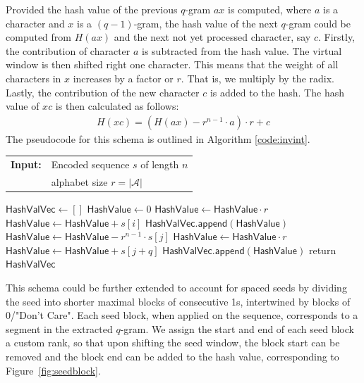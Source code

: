 \documentclass[twoside,a4paper,bsc]{master}
\newcommand{\Qgram}[1]{\(#1\)-gram}
\newcommand{\Append}[0]{\mathsf{append}}
\newcommand{\HashValue}[0]{\mathsf{HashValue}}
\newcommand{\HashValVec}[0]{\mathsf{HashValVec}}
\begin{document}
Provided the hash value of the previous \Qgram{q} \(ax\) is computed, where 
\(a\) is a character and \(x\) is a \Qgram{(q-1)}, the hash value
of the next \Qgram{q} could be computed from \(H(ax)\) and the next not yet
processed character, say \(c\). Firstly, the contribution of character \(a\) is 
subtracted from the hash value. The virtual window is then
shifted right one character. This means that the weight of all characters
in \(x\) increases by a factor or \(r\). That is, we multiply by the radix.
Lastly, the contribution of the new character \(c\) is added to the hash.
The hash value of \(xc\) is then calculated as follows:
\begin{align}
H(xc) = (H(ax)-r^{n-1}\cdot a)\cdot r+c\label{IncrementallyComputeH}
\end{align}
The pseudocode for this schema is outlined in Algorithm \ref{code:invint}.
\begin{algorithm}[t]
\caption{Invertible Integer Encoding for \Qgram{q}s}
\label{code:invint}
\begin{tabular}{@{}l@{~}l}
\textbf{Input:}&Encoded sequence $s$ of length $n$\\
&alphabet size \(r=|\mathcal{A}|\)\\
\end{tabular}
\begin{algorithmic}
\State \(\HashValVec\gets []\)
\State \(\HashValue \gets 0\)
\State \(\HashValue \gets \HashValue \cdot r\)
\State \(\HashValue \gets \HashValue + s[i]\)
\EndFor
\State \(\HashValVec .\Append(\HashValue)\)
\State \(\HashValue \gets \HashValue - r^{n-1}\cdot s[j]\)
\State \(\HashValue \gets \HashValue \cdot r\)
\State \(\HashValue \gets \HashValue + s[j+q]\)
\State \(\HashValVec .\Append(\HashValue)\)
\EndFor
\State return \(\HashValVec\)
\end{algorithmic}
\end{algorithm}

This schema could be further extended to account for spaced seeds by dividing
the seed into shorter maximal blocks of consecutive 1s, intertwined by blocks of
0/"Don't Care". Each seed block, when applied on the sequence, corresponds
to a segment in the extracted \Qgram{q}. We assign the start and end of
each seed block a custom rank, so that upon shifting the seed window,
the block start can be removed and the block end can be added to the hash
value, corresponding to Figure~\ref{fig:seedblock}.
\end{document}
